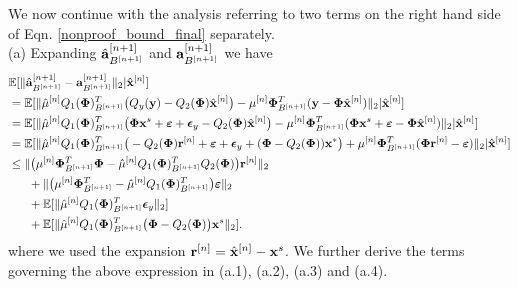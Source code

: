 \documentclass{article}
\begin{document}
We now continue with the analysis referring to two terms on the right hand side of Eqn. \ref{nonproof_bound_final} separately.\\

{(a)} Expanding $\hat{{\bf a}}_{B^{[n+1]}}^{[n+1]}$ and ${{\bf a}}_{B^{[n+1]}}^{[n+1]}$ we have
\begin{equation}\label{quantization_error_terms}
    \begin{split}
      &\mathbb{E}[  \|\hat{{\bf a}}_{B^{[n+1]}}^{[n+1]} - {{\bf a}}_{B^{[n+1]}}^{[n+1]} \|_2| \hat{{\bf x}}^{[n]}] \\
      &= \mathbb{E}[\|\hat{\mu}^{[n]}Q_1({\bf {\bf \Phi}})_{B^{[n+1]}}^T\big(Q_y({\bf y})-Q_2({\bf {\bf \Phi}})\hat{{\bf x}}^{[n]}\big) - {\mu}^{[n]}{\bf {\bf \Phi}}_{B^{[n+1]}}^T({\bf y}-{\bf {\bf \Phi}}\hat{{\bf x}}^{[n]}) \|_2| \hat{{\bf x}}^{[n]}]\\
        &=\mathbb{E}[\|\hat{\mu}^{[n]}Q_1({\bf {\bf \Phi}})_{B^{[n+1]}}^T\big({\bf {\bf \Phi}} {\bf x}^s +\boldsymbol{\varepsilon}+\boldsymbol{\epsilon}_y-Q_2({\bf {\bf \Phi}})\hat{{\bf x}}^{[n]}\big) - {\mu}^{[n]}{\bf {\bf \Phi}}_{B^{[n+1]}}^T({\bf {\bf \Phi}}{\bf x}^s +\boldsymbol{\varepsilon}-{\bf {\bf \Phi}}\hat{{\bf x}}^{[n]}) \|_2| \hat{{\bf x}}^{[n]}]\\
        &=\mathbb{E}[\|\hat{\mu}^{[n]}Q_1({\bf {\bf \Phi}})_{B^{[n+1]}}^T\big(-Q_2({\bf {\bf \Phi}}) {\bf r}^{[n]} +\boldsymbol{\varepsilon}+\boldsymbol{\epsilon}_y+({\bf {\bf \Phi}}-Q_2({\bf {\bf \Phi}})){\bf x}^{*}\big)+{\mu}^{[n]}{\bf {\bf \Phi}}_{B^{[n+1]}}^T({\bf {\bf \Phi}}{\bf r}^{[n]} -\boldsymbol{\varepsilon}) \|_2| \hat{{\bf x}}^{[n]}]\\
        &\leq \|\big(\mu^{[n]}{\bf {\bf \Phi}}_{B^{[n+1]}}^T{\bf {\bf \Phi}} - \hat{\mu}^{[n]}Q_1({\bf {\bf \Phi}})_{B^{[n+1]}}^T Q_2({\bf {\bf \Phi}})\big) {\bf r}^{[n]} \|_2\\
        &\ \ \ \ \  +\|\big(\mu^{[n]}{\bf {\bf \Phi}}_{B^{[n+1]}}^T - \hat{\mu}^{[n]}Q_1({\bf {\bf \Phi}})_{B^{[n+1]}}^T \big)\boldsymbol{\varepsilon} \|_2\\
     &\ \ \ \  \  +\mathbb{E}[\|\hat{\mu}^{[n]}Q_1({\bf {\bf \Phi}})_{B^{[n+1]}}^T\boldsymbol{\epsilon}_y \|_2]\\
     &\ \ \ \  \  +\mathbb{E}[\| \hat{\mu}^{[n]}Q_1({\bf \Phi})_{B^{[n+1]}}^T\big({\bf {\bf \Phi}}-Q_2({\bf {\bf \Phi}})\big){\bf x}^s \|_2].
    \end{split}
\end{equation} where we used the expansion ${{\bf r}}^{[n]} = \hat{{\bf x}}^{[n]}-{\bf x}^s$. We further derive the terms governing the above expression in (a.1), (a.2), (a.3) and (a.4). \\
\end{document}

